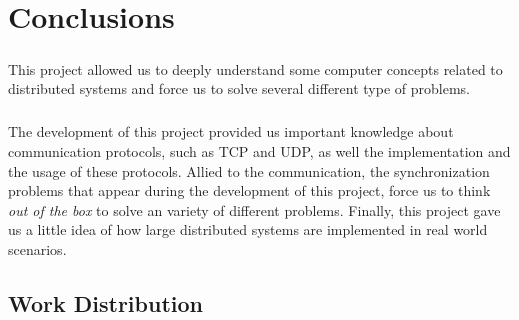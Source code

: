 \documentclass{report}
\begin{document}
	\chapter{Conclusions}
	
	        \paragraph{}This project allowed us to deeply understand some computer concepts
			related to distributed systems and force us to solve several different type of 
			problems. 
	        
	        \paragraph{} The development of this project provided us important knowledge
			about communication protocols, such as TCP and UDP, as well the implementation and
			the usage of these protocols. Allied to the communication, the synchronization 
			problems that appear during the development of this project, force us to think 
			\emph{out of the box} to solve an variety of different problems. Finally, this 
			project gave us a little idea of how large distributed systems are implemented
			in real world scenarios. 
			
			\section{Work Distribution}
\end{document}
